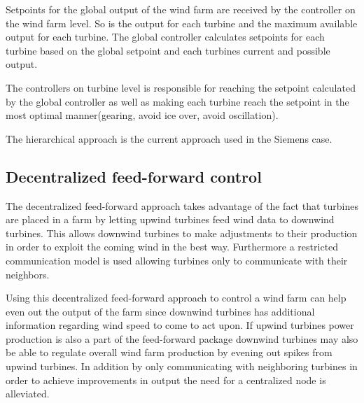 Setpoints for the global output of the wind farm are received by the controller on the wind farm level.
So is the output for each turbine and the maximum available output for each turbine.
The global controller calculates setpoints for each turbine based on the global setpoint and each turbines current and possible output.

The controllers on turbine level is responsible for reaching the setpoint calculated by the global controller as well as making each turbine reach the setpoint in the most optimal manner(gearing, avoid ice over, avoid oscillation).

The hierarchical approach is the current approach used in the Siemens case.

\subsection{Decentralized feed-forward control}
The decentralized feed-forward approach\cite{DecentralisedFeedforwardControlOfWindFarms} takes advantage of the fact that turbines are placed in a farm by letting upwind turbines feed wind data to downwind turbines. 
This allows downwind turbines to make adjustments to their production in order to exploit the coming wind in the best way.
Furthermore a restricted communication model is used allowing turbines only to communicate with their neighbors.

Using this decentralized feed-forward approach to control a wind farm can help even out the output of the farm since downwind turbines has additional information regarding wind speed to come to act upon. If upwind turbines power production is also a part of the feed-forward package downwind turbines may also be able to regulate overall wind farm production by evening out spikes from upwind turbines.
In addition by only communicating with neighboring turbines in order to achieve improvements in output the need for a centralized node is alleviated.

